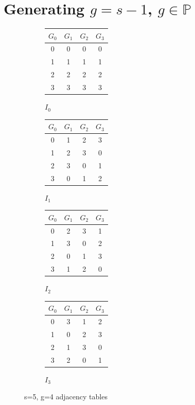 \documentclass[11pt, oneside]{article} 	%
\begin{document}
\section{Generating $g = s-1$, $g \in \mathbb{P}$}
\begin{figure}
\begin{subfigure}{.25\textwidth}
\begin{tabular}{||c c c c||} 
 \hline
$G_0$  & $G_1$ & $G_2$ & $G_3$ \\ [0.5ex] 
 \hline\hline
 0 & 0 & 0 & 0 \\ 
 \hline
 1 & 1 & 1 & 1 \\
 \hline
 2 & 2 & 2  & 2 \\
 \hline
 3 & 3  & 3 & 3 \\
 \hline
\end{tabular}
\caption{$I_0$}
\end{subfigure}
\begin{subfigure}{.25\textwidth}
\begin{tabular}{||c c c c||} 
 \hline
$G_0$  & $G_1$ & $G_2$ & $G_3$ \\ [0.5ex] 
 \hline\hline
 0 & 1 &  2 & 3 \\ 
 \hline
 \cellcolor{green} 1 & \cellcolor{green}  2 &  \cellcolor{green} 3 &  \cellcolor{green} 0 \\
 \hline
 2 & 3 & 0  & 1 \\
 \hline
 3 & 0  & 1 & 2 \\
 \hline
\end{tabular}
\caption{$I_1$}
\end{subfigure}
\begin{subfigure}{.25\textwidth}
\begin{tabular}{||c c c c||} 
 \hline
$G_0$  & $G_1$ & $G_2$ & $G_3$ \\ [0.5ex] 
 \hline\hline
 0 & 2 & 3 & 1 \\ 
 \hline
 1 & 3 & 0 & 2 \\
 \hline
 2 & 0 & 1  & 3 \\
 \hline
 3 & 1  & 2 & 0 \\
 \hline
\end{tabular}
\caption{$I_2$}
\end{subfigure}
\begin{subfigure}{.25\textwidth}
\begin{tabular}{||c c c c||} 
 \hline
$G_0$  & $G_1$ & $G_2$ & $G_3$ \\ [0.5ex] 
 \hline\hline
 0 & 3 & 1 & 2 \\ 
 \hline
 1 & 0 & 2 & 3 \\
 \hline
 2 & 1 & 3  & 0 \\
 \hline
 3 & 2  & 0 & 1 \\
 \hline
\end{tabular}
\caption{$I_3$}
\end{subfigure}
\caption{s=5, g=4 adjacency tables}
\end{figure}
\end{document}
